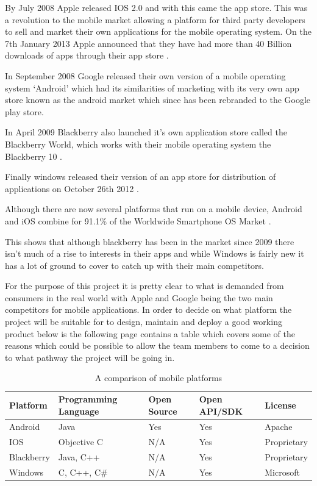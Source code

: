 By July 2008 Apple released IOS 2.0 and with this came the app store. This was a revolution to the mobile market allowing a platform for third party developers to sell and market their own applications for the mobile operating system. On the 7th January 2013 Apple announced that they have had more than 40 Billion downloads of apps through their app store \citep{40billion12}.

In September 2008 Google released their own version of a mobile operating system ‘Android’ which had its similarities of marketing with its very own app store known as the android market which since has been rebranded to the Google play store. 

In April 2009 Blackberry also launched it’s own application store called the Blackberry World, which works with their mobile operating system the Blackberry 10 \citep{bbworld09}.

Finally windows released their version of an app store for distribution of applications on October 26th 2012 \citep{windows8}.

Although there are now several platforms that run on a mobile device, Android and iOS combine for 91.1\% of the Worldwide Smartphone OS Market \citep{idc13}.

This shows that although blackberry has been in the market since 2009 there isn’t much of a rise to interests in their apps and while Windows is fairly new it has a lot of ground to cover to catch up with their main competitors.

For the purpose of this project it is pretty clear to what is demanded from consumers in the real world with Apple and Google being the two main competitors for mobile applications. In order to decide on what platform the project will be suitable for to design, maintain and deploy a good working product below is the following page contains a table which covers some of the reasons which could be possible to allow the team members to come to a decision to what pathway the project will be going in.

\begin{table}[H]
    \centering
    \begin{tabular}{|p{2cm}|p{3cm}|p{2cm}|p{2.5cm}|p{2.5cm}|}
    \hline
    \textbf{Platform} & \textbf{Programming Language} & \textbf{Open Source} & \textbf{Open API/SDK} & \textbf{License} \\ \hline
    Android                    & Java                 & Yes         & Yes          & Apache \\ \hline
    IOS                        & Objective C          & N/A         & Yes          & Proprietary    \\ \hline
    Blackberry                 & Java, C++            & N/A         & Yes          & Proprietary    \\ \hline
    Windows                    & C, C++, C\#           & N/A         & Yes          & Microsoft \\ \hline
    \end{tabular}
    \caption {A comparison of mobile platforms}
\end{table}


